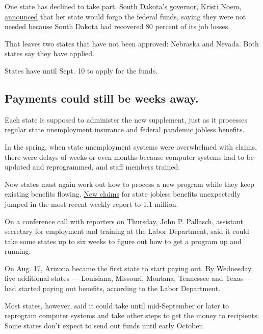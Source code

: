 One state has declined to take part.
\href{https://www.nytimes3xbfgragh.onion/2020/08/16/us/elections/south-dakota-governor-turns-down-extra-unemployment-funding-saying-the-state-doesnt-need-it.html}{South
Dakota's governor, Kristi Noem, announced} that her state would forgo
the federal funds, saying they were not needed because South Dakota had
recovered 80 percent of its job losses.

That leaves two states that have not been approved: Nebraska and Nevada.
Both states say they have applied.

States have until Sept. 10 to apply for the funds.

\hypertarget{payments-could-still-be-weeks-away}{%
\subsection{Payments could still be weeks
away.}\label{payments-could-still-be-weeks-away}}

Each state is supposed to administer the new supplement, just as it
processes regular state unemployment insurance and federal pandemic
jobless benefits.

In the spring, when state unemployment systems were overwhelmed with
claims, there were delays of weeks or even months because computer
systems had to be updated and reprogrammed, and staff members trained.

Now states must again work out how to process a new program while they
keep existing benefits flowing.
\href{https://www.nytimes3xbfgragh.onion/2020/08/20/business/economy/unemployment-claims.html}{New
claims} for state jobless benefits unexpectedly jumped in the most
recent weekly report to 1.1 million.

On a conference call with reporters on Thursday, John P. Pallasch,
assistant secretary for employment and training at the Labor Department,
said it could take some states up to six weeks to figure out how to get
a program up and running.

On Aug. 17, Arizona became the first state to start paying out. By
Wednesday, five additional states --- Louisiana, Missouri, Montana,
Tennessee and Texas --- had started paying out benefits, according to
the Labor Department.

Most states, however, said it could take until mid-September or later to
reprogram computer systems and take other steps to get the money to
recipients. Some states don't expect to send out funds until early
October.

